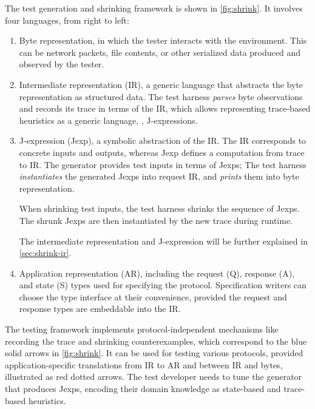 The test generation and shrinking framework is shown in \autoref{fig:shrink}.
It involves four languages, from right to left:
\begin{enumerate}
  \item Byte representation, in which the tester interacts with the environment.
    This can be network packets, file contents, or other serialized data
    produced and observed by the tester.

  \item Intermediate representation (IR), a generic language that abstracts the
    byte representation as structured data.  The test harness {\em parses} byte
    observations and records its trace in terms of the IR, which allows
    representing trace-based heuristics as a generic language, \ie,
    J-expressions.

  \item J-expression (Jexp), a symbolic abstraction of the IR.  The IR
    corresponds to concrete inputs and outputs, whereas Jexp defines a
    computation from trace to IR.  The generator provides test inputs in terms
    of Jexps; The test harness {\em instantiates} the generated Jexps into
    request IR, and {\em prints} them into byte representation.

    When shrinking test inputs, the test harness shrinks the sequence of Jexps.
    The shrunk Jexps are then instantiated by the new trace during runtime.

    The intermediate representation and J-expression will be further explained
    in \autoref{sec:shrink-ir}.

  \item Application representation (AR), including the request (\ilc Q),
    response (\ilc A), and state (\ilc S) types used for specifying the
    protocol.  Specification writers can choose the type interface at their
    convenience, provided the request and response types are embeddable into the
    IR.
\end{enumerate}

The testing framework implements protocol-independent mechanisms like recording
the trace and shrinking counterexamples, which correspond to the blue solid
arrows in \autoref{fig:shrink}.  It can be used for testing various protocols,
provided application-specific translations from IR to AR and between IR and
bytes, illustrated as red dotted arrows.  The test developer needs to tune the
generator that produces Jexps, encoding their domain knowledge as state-based
and trace-based heuristics.

